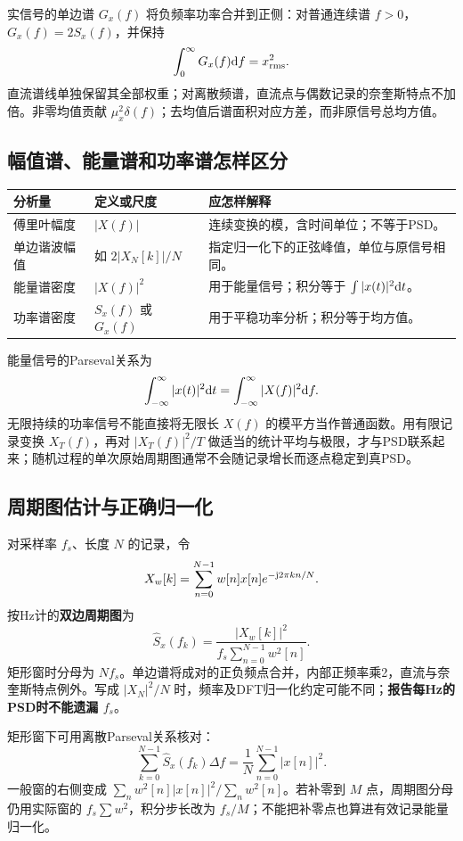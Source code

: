实信号的单边谱 $G_x(f)$ 将负频率功率合并到正侧：对普通连续谱 $f>0$，$G_x(f)=2S_x(f)$，并保持
\[
\int_0^\infty G_x(f)\mathrm{d} f=x_{\mathrm{rms}}^2.
\]
直流谱线单独保留其全部权重；对离散频谱，直流点与偶数记录的奈奎斯特点不加倍。非零均值贡献 $\mu_x^2\delta(f)$；去均值后谱面积对应方差，而非原信号总均方值。

\subsection{幅值谱、能量谱和功率谱怎样区分}
\begin{table}[H]
\centering\small
\begin{tabularx}{\linewidth}{@{}p{2.4cm} p{3.3cm} X@{}}
\toprule
分析量 & 定义或尺度 & 应怎样解释 \\
\midrule
傅里叶幅度 & $|X(f)|$ & 连续变换的模，含时间单位；不等于PSD。 \\
单边谐波幅值 & 如 $2|X_N[k]|/N$ & 指定归一化下的正弦峰值，单位与原信号相同。 \\
能量谱密度 & $|X(f)|^2$ & 用于能量信号；积分等于 $\int|x(t)|^2\mathrm{d} t$。 \\
功率谱密度 & $S_x(f)$ 或 $G_x(f)$ & 用于平稳功率分析；积分等于均方值。 \\
\bottomrule
\end{tabularx}
\end{table}

能量信号的Parseval关系为
\[
\int_{-\infty}^{\infty}|x(t)|^2\mathrm{d} t
=\int_{-\infty}^{\infty}|X(f)|^2\mathrm{d} f.
\]
无限持续的功率信号不能直接将无限长 $X(f)$ 的模平方当作普通函数。用有限记录变换 $X_T(f)$，再对 $|X_T(f)|^2/T$ 做适当的统计平均与极限，才与PSD联系起来；随机过程的单次原始周期图通常不会随记录增长而逐点稳定到真PSD。

\subsection{周期图估计与正确归一化}
对采样率 $f_s$、长度 $N$ 的记录，令
\[
X_w[k]=\sum_{n=0}^{N-1}w[n]x[n]e^{-\mathrm{j}2\pi kn/N}.
\]
按Hz计的\textbf{双边周期图}为
\[
\boxed{\widehat S_x(f_k)=\frac{|X_w[k]|^2}{f_s\sum_{n=0}^{N-1}w^2[n]}}.
\]
矩形窗时分母为 $Nf_s$。单边谱将成对的正负频点合并，内部正频率乘2，直流与奈奎斯特点例外。写成 $|X_N|^2/N$ 时，频率及DFT归一化约定可能不同；\textbf{报告每Hz的PSD时不能遗漏 $f_s$}。

矩形窗下可用离散Parseval关系核对：
\[
\boxed{\sum_{k=0}^{N-1}\widehat S_x(f_k)\Delta f
=\frac1N\sum_{n=0}^{N-1}|x[n]|^2}.
\]
一般窗的右侧变成 $\sum_nw^2[n]|x[n]|^2/\sum_nw^2[n]$。若补零到 $M$ 点，周期图分母仍用实际窗的 $f_s\sum w^2$，积分步长改为 $f_s/M$；不能把补零点也算进有效记录能量归一化。

